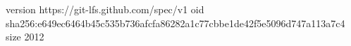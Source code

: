 version https://git-lfs.github.com/spec/v1
oid sha256:e649ec6464b45c535b736afcfa86282a1c77cbbe1de42f5e5096d747a113a7c4
size 2012
